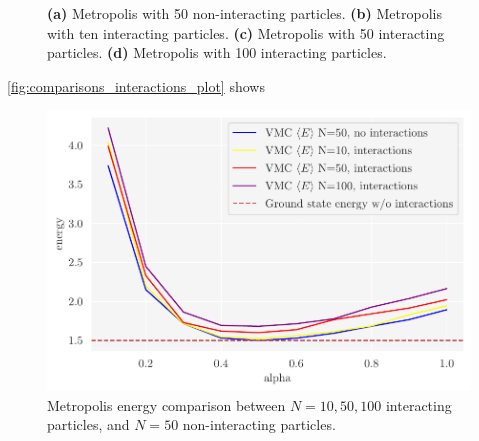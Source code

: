 \begin{figure}[!htb]
\qquad
{}
\caption{\textbf{(a)} Metropolis with 50 non-interacting particles. \textbf{(b)} Metropolis with ten interacting particles. \textbf{(c)} Metropolis with 50 interacting particles. \textbf{(d)} Metropolis with 100 interacting particles.}
\label{fig:interactions_plot}
\end{figure}

\autoref{fig:comparisons_interactions_plot} shows 

\begin{figure}[H]
\begin{center}\includegraphics[scale=0.5]{latex/figures/grid_search_analytical_w_interactions_all_N.pdf}
\end{center}
\caption{Metropolis energy comparison between $N=10, 50, 100$ interacting particles, and $N=50$ non-interacting particles.}
\label{fig:comparisons_interactions_plot}
\end{figure}

